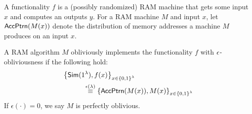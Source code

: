 A functionality $f$ is a (possibly randomized) RAM machine that gets some input $x$ and computes an outputs $y$. For a  RAM machine $M$ and input $x$, let ${\sf AccPtrn}(M(x))$ denote the distribution of memory addresses a machine $M$ produces on an input $x$.
\begin{definition}
A RAM algorithm $M$ obliviously implements the functionality $f$ with ${\epsilon}$-obliviousness if the following hold:
\begin{eqnarray*}
\hspace{-5ex}\lefteqn{\left\{\Sim(1^\lambda),f(x)\right\}_{x \in \bit^\lambda}} \\
&&\hspace{+5ex}\overset{\epsilon(\lambda)}{\equiv} \left\{ {\sf AccPtrn}(M(x)),M(x)\right\}_{x \in \bit^\lambda}
\end{eqnarray*}
If $\epsilon(\cdot)=0$, we say $M$ is perfectly oblivious. 
\end{definition}

%
%

